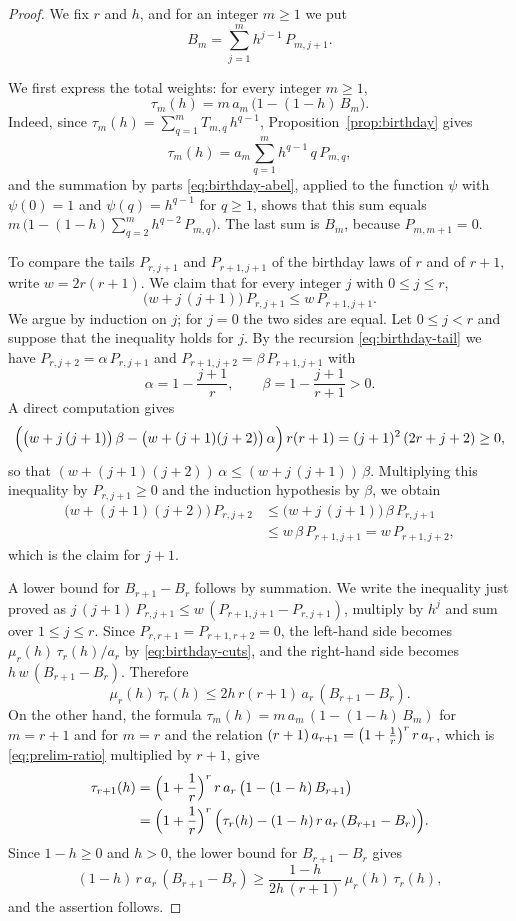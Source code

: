\documentclass{amsart}
\theoremstyle{definition}
\theoremstyle{remark}
\numberwithin{equation}{section}
\begin{document}
\begin{proof}
We fix $r$ and $h$, and for an integer $m\ge 1$ we put
\[
B_m=\sum_{j=1}^{m}h^{j-1}\,P_{m,j+1}.
\]

We first express the total weights: for every integer $m\ge 1$,
\[
\tau_m(h)=m\,a_m\,\bigl(1-(1-h)\,B_m\bigr).
\]
Indeed, since $\tau_m(h)=\sum_{q=1}^{m}T_{m,q}\,h^{q-1}$, Proposition~\ref{prop:birthday} gives
\[
\tau_m(h)=a_m\sum_{q=1}^{m}h^{q-1}\,q\,P_{m,q},
\]
and the summation by parts \eqref{eq:birthday-abel}, applied to the function $\psi$ with $\psi(0)=1$ and $\psi(q)=h^{q-1}$ for $q\ge 1$, shows that this sum equals $m\,\bigl(1-(1-h)\sum_{q=2}^{m}h^{q-2}\,P_{m,q}\bigr)$. The last sum is $B_m$, because $P_{m,m+1}=0$.

To compare the tails $P_{r,j+1}$ and $P_{r+1,j+1}$ of the birthday laws of $r$ and of $r+1$, write $w=2r(r+1)$. We claim that for every integer $j$ with $0\le j\le r$,
\[
\bigl(w+j\,(j+1)\bigr)\,P_{r,j+1}\le w\,P_{r+1,j+1}.
\]
We argue by induction on $j$; for $j=0$ the two sides are equal. Let $0\le j<r$ and suppose that the inequality holds for $j$. By the recursion \eqref{eq:birthday-tail} we have $P_{r,j+2}=\alpha\,P_{r,j+1}$ and $P_{r+1,j+2}=\beta\,P_{r+1,j+1}$ with
\[
\alpha=1-\frac{j+1}{r},\qquad\beta=1-\frac{j+1}{r+1}>0.
\]
A direct computation gives
\[
\Bigl(\bigl(w+j\,(j+1)\bigr)\,\beta-\bigl(w+(j+1)(j+2)\bigr)\,\alpha\Bigr)\,r(r+1)=(j+1)^2\,(2r+j+2)\ge 0,
\]
so that $(w+(j+1)(j+2))\,\alpha\le(w+j\,(j+1))\,\beta$. Multiplying this inequality by $P_{r,j+1}\ge 0$ and the induction hypothesis by $\beta$, we obtain
\begin{align*}
\bigl(w+(j+1)(j+2)\bigr)\,P_{r,j+2}&\le\bigl(w+j\,(j+1)\bigr)\,\beta\,P_{r,j+1}\\
&\le w\,\beta\,P_{r+1,j+1}=w\,P_{r+1,j+2},
\end{align*}
which is the claim for $j+1$.

A lower bound for $B_{r+1}-B_r$ follows by summation. We write the inequality just proved as $j\,(j+1)\,P_{r,j+1}\le w\,(P_{r+1,j+1}-P_{r,j+1})$, multiply by $h^{j}$ and sum over $1\le j\le r$. Since $P_{r,r+1}=P_{r+1,r+2}=0$, the left-hand side becomes $\mu_r(h)\,\tau_r(h)/a_r$ by \eqref{eq:birthday-cuts}, and the right-hand side becomes $h\,w\,(B_{r+1}-B_r)$. Therefore
\[
\mu_r(h)\,\tau_r(h)\le 2h\,r(r+1)\,a_r\,(B_{r+1}-B_r).
\]
On the other hand, the formula $\tau_m(h)=m\,a_m\,(1-(1-h)\,B_m)$ for $m=r+1$ and for $m=r$ and the relation $(r+\nobreak 1)\,a_{r+1}=\bigl(1+\frac1r\bigr)^{r}\,r\,a_r$, which is \eqref{eq:prelim-ratio} multiplied by $r+1$, give
\begin{align*}
\tau_{r+1}(h)&=\Bigl(1+\frac1r\Bigr)^{r}\,r\,a_r\,\bigl(1-(1-h)\,B_{r+1}\bigr)\\
&=\Bigl(1+\frac1r\Bigr)^{r}\,\Bigl(\tau_r(h)-(1-h)\,r\,a_r\,(B_{r+1}-B_r)\Bigr).
\end{align*}
Since $1-h\ge 0$ and $h>0$, the lower bound for $B_{r+1}-B_r$ gives
\[
(1-h)\,r\,a_r\,(B_{r+1}-B_r)\ge\frac{1-h}{2h\,(r+1)}\,\mu_r(h)\,\tau_r(h),
\]
and the assertion follows.
\end{proof}
\end{document}

